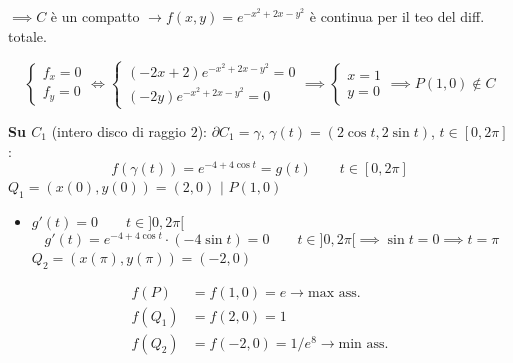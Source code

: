 \begin{esercizio}

\noindent\begin{minipage}{\linewidth}
\centering
{}
\end{minipage}

\vspace{0.5em}
\noindent$\implies C$ è un compatto $\to f(x, y) = e^{-x^2 + 2x - y^2}$ è continua per il teo del diff. totale.


\[
\begin{cases}
f_x = 0 \\
f_y = 0
\end{cases}
\iff
\begin{cases}
(-2x + 2) e^{-x^2 + 2x - y^2} = 0 \\
(-2y) e^{-x^2 + 2x - y^2} = 0
\end{cases}
\implies
\begin{cases}
x = 1 \\
y = 0
\end{cases}
\implies P(1, 0) \notin C
\]

\textbf{Su $C_1$} (intero disco di raggio $2$): $\partial C_1 = \gamma$, $\gamma(t) = (2\cos t, 2\sin t)$, $t \in [0, 2\pi]$:
\[
f(\gamma(t)) = e^{-4 + 4\cos t} = g(t) \qquad t \in [0, 2\pi]
\]
$Q_1 = (x(0), y(0)) = (2, 0)$ \quad $|$ \quad $P(1, 0)$
\begin{itemize}
    \item $g'(t) = 0 \qquad t \in ]0, 2\pi[$
    \[
    g'(t) = e^{-4 + 4\cos t} \cdot (-4\sin t) = 0 \qquad t \in ]0, 2\pi[ \implies \sin t = 0 \implies t = \pi
    \]
    $Q_2 = (x(\pi), y(\pi)) = (-2, 0)$
\end{itemize}
\begin{align*}
f(P) &= f(1, 0) = e \to \text{max ass.} \\
f(Q_1) &= f(2, 0) = 1 \\
f(Q_2) &= f(-2, 0) = 1/e^8 \to \text{min ass.}
\end{align*}


\end{esercizio}
